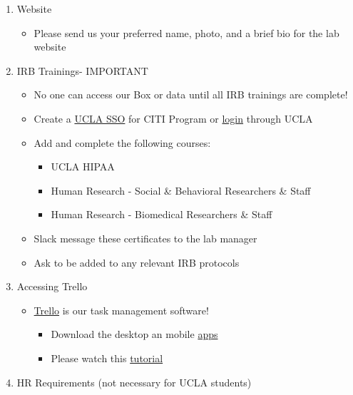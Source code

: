 \documentclass[]{book}
\providecommand{\tightlist}{%
  \setlength{\itemsep}{0pt}\setlength{\parskip}{0pt}}
\begin{document}
\begin{enumerate}
\def\labelenumi{\arabic{enumi}.}
\tightlist
\item
  Website

  \begin{itemize}
  \tightlist
  \item
    Please send us your preferred name, photo, and a brief bio for the lab website
  \end{itemize}
\item
  IRB Trainings- IMPORTANT

  \begin{itemize}
  \tightlist
  \item
    No one can access our Box or data until all IRB trainings are complete!
  \item
    Create a \href{https://ora.research.ucla.edu/OHRPP/Documents/Education/SSO_CITI_New_Acct.pdf}{UCLA SSO} for CITI Program or \href{https://www.research.ucla.edu/CITIProgram/}{login} through UCLA
  \item
    Add and complete the following courses:

    \begin{itemize}
    \tightlist
    \item
      UCLA HIPAA
    \item
      Human Research - Social \& Behavioral Researchers \& Staff
    \item
      Human Research - Biomedical Researchers \& Staff
    \end{itemize}
  \item
    Slack message these certificates to the lab manager
  \item
    Ask to be added to any relevant IRB protocols
  \end{itemize}
\item
  Accessing Trello

  \begin{itemize}
  \tightlist
  \item
    \href{https://trello.com}{Trello} is our task management software!

    \begin{itemize}
    \tightlist
    \item
      Download the desktop an mobile \href{https://trello.com/en-US/platforms}{apps}
    \item
      Please watch this \href{https://youtu.be/_Ry-SnJygy8}{tutorial}
    \end{itemize}
  \end{itemize}
\item
  HR Requirements (not necessary for UCLA students)


\end{enumerate}
\end{document}
